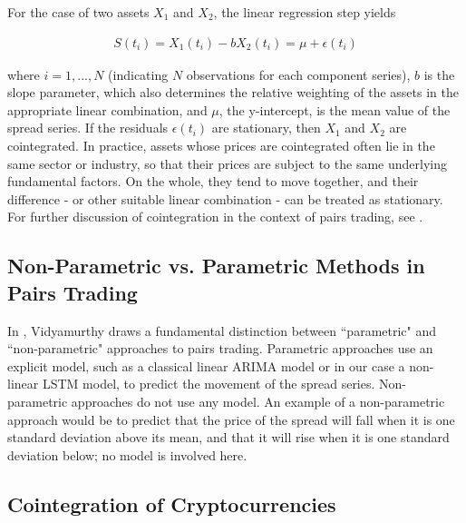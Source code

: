 \documentclass{article}
\begin{document}
\noindent For the case of two assets $X_{1}$ and $X_{2}$, the linear regression step yields 

\begin{align}
S(t_{i}) = X_{1}(t_{i}) - b X_{2}(t_{i}) = \mu + \epsilon(t_{i})
\end{align}

\noindent where $i = 1, ..., N$ (indicating $N$ observations for each component series), $b$ is the slope parameter, which also determines the relative weighting of the assets in the appropriate linear combination, and $\mu$, the y-intercept, is the mean value of the spread series. If the residuals $\epsilon(t_{i})$ are stationary, then $X_{1}$ and $X_{2}$ are cointegrated. In practice, assets whose prices are cointegrated often lie in the same sector or industry, so that their prices are subject to the same underlying fundamental factors. On the whole, they tend to move together, and their difference - or other suitable linear combination - can be treated as stationary. For further discussion of cointegration in the context of pairs trading, see \cite{vidyamurthy2004pairs}. 



\subsection{Non-Parametric vs. Parametric Methods in Pairs Trading}

In \cite{vidyamurthy2004pairs}, Vidyamurthy draws a fundamental distinction between ``parametric" and ``non-parametric" approaches to pairs trading. Parametric approaches use an explicit model, such as a classical linear ARIMA model or in our case a non-linear LSTM model, to predict the movement of the spread series. Non-parametric approaches do not use any model. An example of a non-parametric approach would be to predict that the price of the spread will fall when it is one standard deviation above its mean, and that it will rise when it is one standard deviation below; no model is involved here. 

\subsection{Cointegration of Cryptocurrencies}
\end{document}
